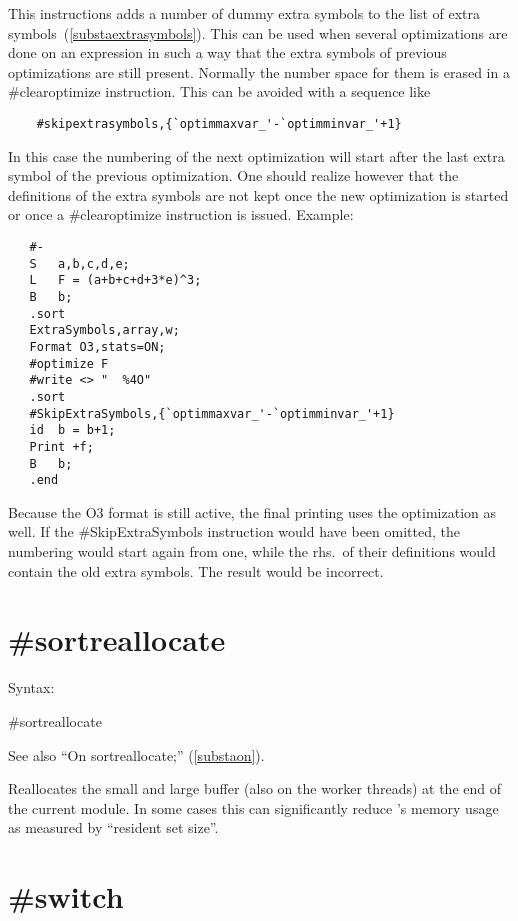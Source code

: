 \noindent This instructions adds a number of dummy extra 
symbols to the list of extra 
symbols~(\ref{substaextrasymbols}). This can be used when several 
optimizations are done on an expression in such a way that the extra 
symbols of previous optimizations are still present. Normally the number 
space for them is erased in a \#clearoptimize instruction. This can be 
avoided with a sequence like
\begin{verbatim}
	#skipextrasymbols,{`optimmaxvar_'-`optimminvar_'+1}
\end{verbatim}
In this case the numbering of the next optimization will start after the 
last extra symbol of the previous optimization.
One should realize however that the definitions of the extra symbols are 
not kept once the new optimization is started or once a \#clearoptimize 
instruction is issued. Example:
\begin{verbatim}
   #-
   S   a,b,c,d,e;
   L   F = (a+b+c+d+3*e)^3;
   B   b;
   .sort
   ExtraSymbols,array,w;
   Format O3,stats=ON;
   #optimize F
   #write <> "  %4O"
   .sort
   #SkipExtraSymbols,{`optimmaxvar_'-`optimminvar_'+1}
   id  b = b+1;
   Print +f;
   B   b;
   .end
\end{verbatim}
Because the O3 format is still active, the final printing uses the 
optimization as well. If the \#SkipExtraSymbols instruction would have been 
omitted, the numbering would start again from one, while the rhs.\ of their 
definitions would contain the old extra symbols. The result would be 
incorrect.


\section{\#sortreallocate}
\label{presortreallocate}

\noindent Syntax:

\#sortreallocate

\noindent See also ``On sortreallocate;'' (\ref{substaon}).

\noindent Reallocates the small and large buffer (also on the worker threads)
at the end of the current module. In some cases this can significantly reduce
\FORM's memory usage as measured by ``resident set size''.


\section{\#switch}
\label{preswitch}

